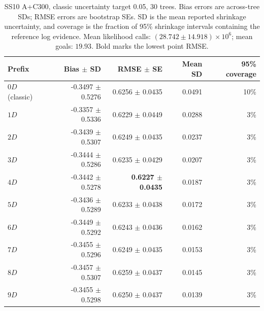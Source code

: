 \begin{table}[t]
\centering
\scriptsize
\caption{SS10 A+C300, classic uncertainty target 0.05, 30 trees. Bias errors are across-tree SDs; RMSE errors are bootstrap SEs. SD is the mean reported shrinkage uncertainty, and coverage is the fraction of 95\% shrinkage intervals containing the reference log evidence. Mean likelihood calls: $(28.742\pm14.918)\times10^6$; mean goals: $19.93$. Bold marks the lowest point RMSE.}
\label{tab:phantom_evidence_ss10_0p05}
\begin{tabular}{lrrrr}
\toprule
Prefix & Bias $\pm$ SD & RMSE $\pm$ SE & Mean SD & 95\% coverage \\
\midrule
$0D$ (classic) & -0.3497 $\pm$ 0.5276 & 0.6256 $\pm$ 0.0435 & 0.0491 & 10\% \\
$1D$ & -0.3357 $\pm$ 0.5336 & 0.6229 $\pm$ 0.0449 & 0.0288 & 3\% \\
$2D$ & -0.3439 $\pm$ 0.5307 & 0.6249 $\pm$ 0.0435 & 0.0237 & 3\% \\
$3D$ & -0.3444 $\pm$ 0.5286 & 0.6235 $\pm$ 0.0429 & 0.0207 & 3\% \\
$4D$ & -0.3442 $\pm$ 0.5278 & \textbf{0.6227 $\pm$ 0.0435} & 0.0187 & 3\% \\
$5D$ & -0.3436 $\pm$ 0.5289 & 0.6233 $\pm$ 0.0438 & 0.0172 & 3\% \\
$6D$ & -0.3449 $\pm$ 0.5292 & 0.6243 $\pm$ 0.0436 & 0.0162 & 3\% \\
$7D$ & -0.3455 $\pm$ 0.5296 & 0.6249 $\pm$ 0.0435 & 0.0153 & 3\% \\
$8D$ & -0.3457 $\pm$ 0.5307 & 0.6259 $\pm$ 0.0437 & 0.0145 & 3\% \\
$9D$ & -0.3455 $\pm$ 0.5298 & 0.6250 $\pm$ 0.0437 & 0.0139 & 3\% \\
\bottomrule
\end{tabular}
\end{table}

